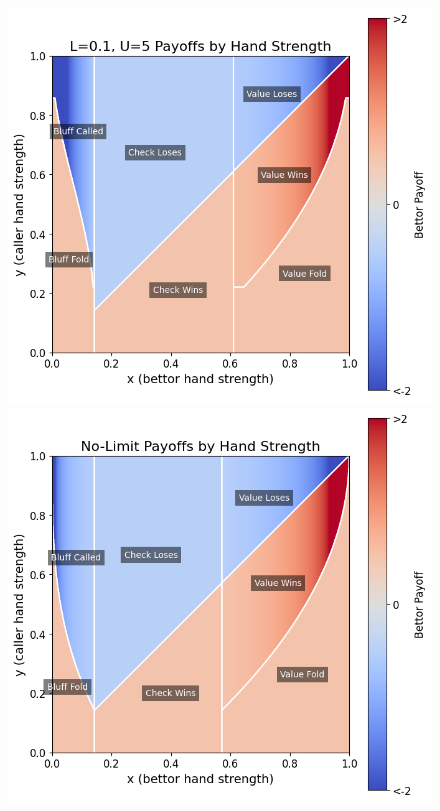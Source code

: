 \documentclass[../../main/main.tex]{subfiles}
\begin{document}
\begin{figure}[p]
\begin{adjustwidth}{-1.25in}{-1.25in}
\begin{minipage}{0.4\textwidth}
        \end{minipage}
        \vspace{0.4cm}\\
        \begin{minipage}{0.4\textwidth}
            \centering
            \includegraphics[width=\textwidth]{images/payoffs_0.1_5.png}
        \end{minipage}
        \hspace{0.05\textwidth}
        \begin{minipage}{0.4\textwidth}
            \centering
            \includegraphics[width=\textwidth]{images/payoffs_0_inf.png}

\end{minipage}
\end{adjustwidth}
\end{figure}
\end{document}
